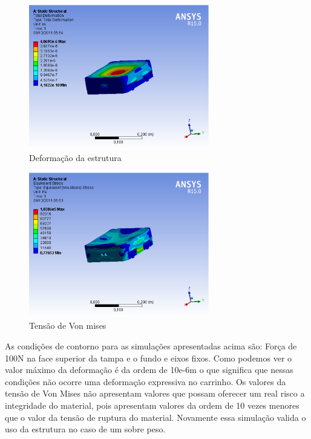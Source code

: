 \begin{figure}[H]
    \centering
    \includegraphics[width=0.7\textwidth]{figuras/sobrepeso_deformacao.eps}
    \caption{Deformação da estrutura}
    \label{fig:sobrepeso_deformacao}
\end{figure}

\begin{figure}[H]
    \centering
    \includegraphics[width=0.7\textwidth]{figuras/sobrepeso_von.eps}
    \caption{Tensão de Von mises}
    \label{fig:sobrepeso_von}
\end{figure}

As condições de contorno para as simulações apresentadas acima são: Força de 100N na face superior da tampa e o fundo e eixos fixos. 
Como podemos ver o valor máximo da deformação é da ordem de 10e-6m o que significa que nessas condições não ocorre uma deformação expressiva
no carrinho. Os valores da tensão de Von Mises não apresentam valores que possam oferecer um real risco a integridade do material, pois
apresentam valores da ordem de 10 vezes menores que o valor da tensão de ruptura do material. Novamente essa simulação valida o uso da
estrutura no caso de um sobre peso.

